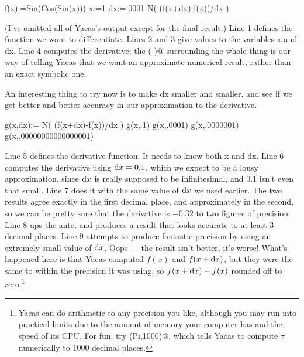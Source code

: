 \pagebreak

\restartLineNumbers
\begin{eg}
\startcodeeg
\begin{Code}
  \nn f(x):=Sin(Cos(Sin(x)))
  \nn x:=1
  \nn dx:=.0001
  \nn N( (f(x+dx)-f(x))/dx )
\end{Code}
\finishcodeeg
\end{eg}


(I've omitted all of Yacas's output except for the final result.)
Line 1 defines the function we want to differentiate. Lines 2 and
3 give values to the variables x and dx. Line 4 computes the derivative;
the \verb@N( )@ surrounding the whole thing is our way of telling Yacas
that we want an approximate numerical result, rather than an exact symbolic one.

An interesting thing to try now is to make dx smaller and smaller, and see if
we get better and better accuracy in our approximation to the derivative.

\begin{eg}\label{eg:derivative-limit}
\startcodeeg
\begin{Code}
  \nn g(x,dx):= 
  \cc N( (f(x+dx)-f(x))/dx )
  \nn g(x,.1)
  \nn g(x,.0001)
  \nn g(x,.0000001)
  \nn g(x,.00000000000000001)
\end{Code}
\end{eg}

Line 5 defines the derivative function. It needs to know both x and dx. Line
6 computes the derivative using $\textup{d} x=0.1$, which we expect to be a lousy approximation,
since $\textup{d} x$ is really supposed to be infinitesimal, and $0.1$ isn't even that small.
Line 7 does it with the same value of $\textup{d} x$ we used earlier. The two results agree
exactly in the first decimal place, and approximately in the second, so we can be
pretty sure that the derivative is $-0.32$ to two figures of precision. Line 8
ups the ante, and produces a result that looks accurate to at least 3 decimal places.
Line 9 attempts to produce fantastic precision by using an extremely small value of $\textup{d} x$.
Oops --- the result isn't better, it's worse! What's happened here is that Yacas
computed $f(x)$ and $f(x+\textup{d} x)$, but they were the same to within the precision it
was using, so $f(x+\textup{d} x)-f(x)$ rounded off to zero.\footnote{Yacas can do arithmetic
to any precision you like, although you may run into practical limits due to the amount
of memory your computer has and the speed of its CPU. For fun, try \verb@N(Pi,1000)@,
which tells Yacas to compute $\pi$ numerically to 1000 decimal places.}

